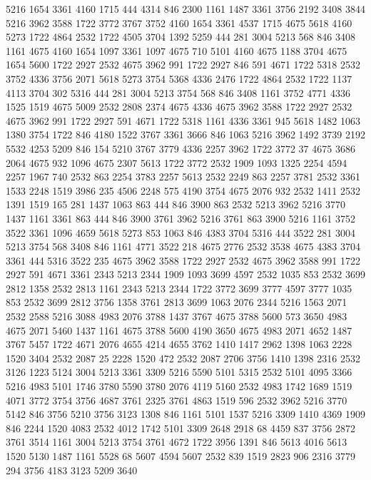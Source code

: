  {} 5216 1654 3361 4160 1715 444 {} 4314 846 2300 1161 1487 3361 3756 2192 3408 3844 5216 3962 3588 1722 3772
{} 3767 3752 4160 1654 3361 4537 1715 4675 5618 4160 5273 1722 4864 2532 1722 4505 3704 1392 5259 444 281 3004 5213 568 846 3408
{} 1161 4675 4160 1654 1097 3361 1097 4675 710 {} 5101 4160 4675 1188
{} 3704 4675 1654 5600 1722 2927 2532 4675 3962 991 1722 2927 846 591 4671 1722 5318
{} 2532 3752 4336 3756 2071 5618 5273 3754 5368 4336 2476 1722 4864 2532 1722 1137 4113 3704 302 5316 444 281 3004 5213 3754 568 846 3408
{} 1161 3752 4771 4336 1525 1519 4675 5009 2532 2808 2374 4675 4336 4675 3962 3588 1722 2927 2532 4675 3962 991 1722 2927 591 4671 1722 5318
{} 1161 4336 3361 945 5618 1482 1063 1380 3754 1722 846 4180 1522
{} 3767 3361 3666 846 1063 5216 3962 1492 3739 2192 5532 4253 5209 846 154
{} 5210 3767 3779 4336 2257 3962 1722 3772 37 4675 3686
{} 2064 4675 932 1096 4675 2307 5613 1722 3772 {} 2532 1909 1093
{} 1325 2254 4594 2257 1967 740
{} 2532 863 2254 3783 2257 5613 2532 2249 863 2257 3781
{} 2532 3361 1533 2248 1519 3986 235 4506 2248 575 4190 3754 4675 2076 932 2532 1411 2532 1391 1519 165 281
{} 1437 1063 863 444 846 3900 863 2532 5213 3962 5216 3770
{} 1437 1161 3361 863 444 846 3900 3761 3962 5216 3761 863 3900 5216
{} 1161 3752 3522 3361 1096 4659 5618 5273 853 1063 846 4383 3704 5316 444 3522 281 3004 5213 3754 568 3408 846
{} 1161 4771 3522 218 4675 2776 2532 3538 4675 4383
{} 3704 3361 444 5316 {} 3522 235 4675 3962 3588 1722 2927 2532 4675 3962 3588 991 1722 2927 591 4671
{} 3361 2343 5213 2344 1909 1093 3699 4597 2532 1035 853 2532 3699 2812 1358 2532 2813
{} 1161 2343 5213 2344 1722 3772 3699 3777 4597 3777 1035 {} 853 2532 3699 2812 3756 1358 3761 2813
{} 3699 1063 2076 2344 5216 1563 2071 2532 2588 5216
{} 3088 {} 4983 2076 3788 1437 3767 4675 3788 5600 573 3650 4983 4675 2071 5460
{} 1437 1161 4675 3788 5600 4190 3650 4675 4983 2071 4652 1487 3767 5457 1722 4671 2076 4655 4214 {} 4655
{} 3762 1410 1417 2962 1398 1063 2228 1520 3404 2532 2087 25 2228 1520 472 2532 2087 2706 3756 1410 1398 2316 2532 3126
{} 1223 5124 3004 5213 3361 3309 5216 5590 5101 5315 2532 5101 4095 3366 5216 4983 5101 {} 1746 3780 5590 3780 2076 4119 {} 5160 2532 4983 {} 1742
{} 1689 1519 4071 3772 3754 3756 4687 3761 {} 2325 3761 {} 4863 1519 596 2532 3962 5216 3770 5142 846 3756 5210 3756 {} 3123 1308 {} 846
{} 1161 5101 1537 5216 3309 1410 4369 1909 846 2244 1520 4083
{} 2532 4012 1742 5101 3309 2648 2918 68 4459 837 3756 2872 3761 {} 3514
{} 1161 3004 5213 3754 3761 4672 1722 3956 1391 846 {} 5613 {} 4016 5613 1520 5130
{} 1487 1161 5528 68 5607 4594 5607 2532 839 1519 2823 906 2316 3779 294 {} 3756 4183 3123 5209 {} 3640
